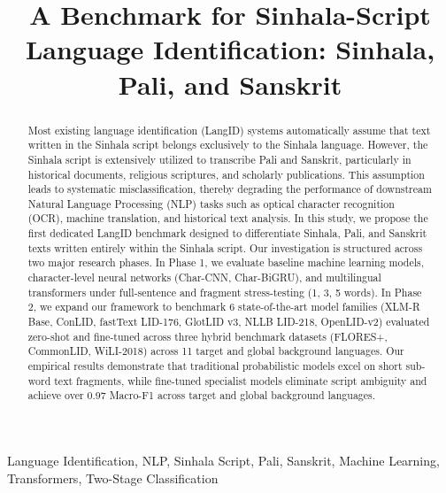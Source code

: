\documentclass[conference]{IEEEtran}
\begin{document}
\title{A Benchmark for Sinhala-Script Language Identification: Sinhala, Pali, and Sanskrit}

\author{
}

\maketitle

\begin{abstract}
Most existing language identification (LangID) systems automatically assume that text written in the Sinhala script belongs exclusively to the Sinhala language. However, the Sinhala script is extensively utilized to transcribe Pali and Sanskrit, particularly in historical documents, religious scriptures, and scholarly publications. This assumption leads to systematic misclassification, thereby degrading the performance of downstream Natural Language Processing (NLP) tasks such as optical character recognition (OCR), machine translation, and historical text analysis. In this study, we propose the first dedicated LangID benchmark designed to differentiate Sinhala, Pali, and Sanskrit texts written entirely within the Sinhala script. Our investigation is structured across two major research phases. In Phase 1, we evaluate baseline machine learning models, character-level neural networks (Char-CNN, Char-BiGRU), and multilingual transformers under full-sentence and fragment stress-testing (1, 3, 5 words). In Phase 2, we expand our framework to benchmark 6 state-of-the-art model families (XLM-R Base, ConLID, fastText LID-176, GlotLID v3, NLLB LID-218, OpenLID-v2) evaluated zero-shot and fine-tuned across three hybrid benchmark datasets (FLORES+, CommonLID, WiLI-2018) across 11 target and global background languages. Our empirical results demonstrate that traditional probabilistic models excel on short sub-word text fragments, while fine-tuned specialist models eliminate script ambiguity and achieve over 0.97 Macro-F1 across target and global background languages.
\end{abstract}

\begin{IEEEkeywords}
Language Identification, NLP, Sinhala Script, Pali, Sanskrit, Machine Learning, Transformers, Two-Stage Classification
\end{IEEEkeywords}
\end{document}

